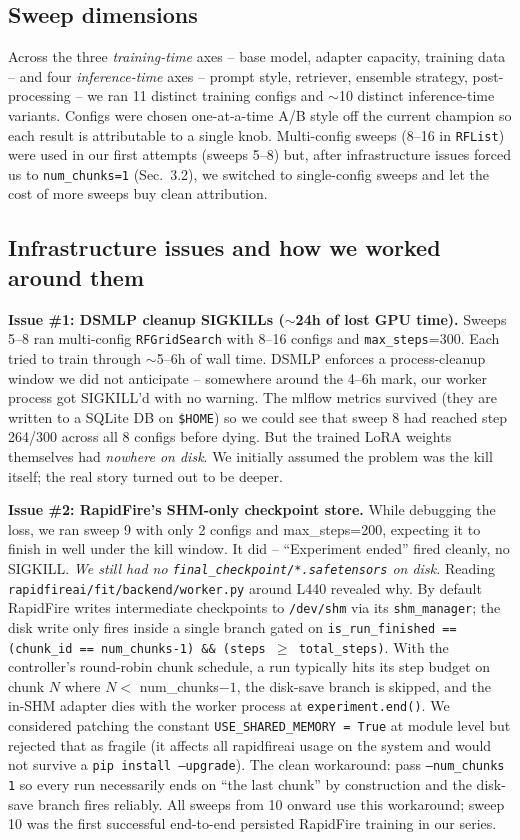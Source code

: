 \documentclass[10pt]{article}
\begin{document}
\subsection{Sweep dimensions}
Across the three \emph{training-time} axes -- base model, adapter capacity,
training data -- and four \emph{inference-time} axes -- prompt style, retriever,
ensemble strategy, post-processing -- we ran 11 distinct training configs and
$\sim$10 distinct inference-time variants. Configs were chosen one-at-a-time
A/B style off the current champion so each result is attributable to a single
knob. Multi-config sweeps (8--16 in \texttt{RFList}) were used in our first
attempts (sweeps 5--8) but, after infrastructure issues forced us to
\texttt{num\_chunks=1} (Sec.~3.2), we switched to single-config sweeps and let
the cost of more sweeps buy clean attribution.

\subsection{Infrastructure issues and how we worked around them}

\textbf{Issue \#1: DSMLP cleanup SIGKILLs ($\sim$24h of lost GPU time).}
Sweeps 5--8 ran multi-config \texttt{RFGridSearch} with 8--16 configs and
\texttt{max\_steps}=300. Each tried to train through $\sim$5--6h of wall time.
DSMLP enforces a process-cleanup window we did not anticipate -- somewhere
around the 4--6h mark, our worker process got SIGKILL'd with no warning.
The mlflow metrics survived (they are written to a SQLite DB on
\texttt{\$HOME}) so we could see that sweep 8 had reached step 264/300
across all 8 configs before dying. But the trained LoRA weights themselves had
\emph{nowhere on disk}. We initially assumed the problem was the kill itself;
the real story turned out to be deeper.

\textbf{Issue \#2: RapidFire's SHM-only checkpoint store.} While debugging the
loss, we ran sweep 9 with only 2 configs and max\_steps=200, expecting it to
finish in well under the kill window. It did -- ``Experiment ended'' fired
cleanly, no SIGKILL. \emph{We still had no
\texttt{final\_checkpoint/*.safetensors} on disk.} Reading
\texttt{rapidfireai/fit/backend/worker.py} around L440 revealed why. By default
RapidFire writes intermediate checkpoints to \texttt{/dev/shm} via its
\texttt{shm\_manager}; the disk write only fires inside a single branch gated on
\texttt{is\_run\_finished == (chunk\_id == num\_chunks-1) \&\&
(steps $\geq$ total\_steps)}. With the controller's round-robin chunk schedule,
a run typically hits its step budget on chunk $N$ where $N <$ num\_chunks$-1$,
the disk-save branch is skipped, and the in-SHM adapter dies with the worker
process at \texttt{experiment.end()}. We considered patching the constant
\texttt{USE\_SHARED\_MEMORY = True} at module level but rejected that as
fragile (it affects all rapidfireai usage on the system and would not survive
a \texttt{pip install --upgrade}). The clean workaround: pass
\texttt{--num\_chunks 1} so every run necessarily ends on ``the last chunk'' by
construction and the disk-save branch fires reliably. All sweeps from 10 onward
use this workaround; sweep 10 was the first successful end-to-end persisted
RapidFire training in our series.
\end{document}
